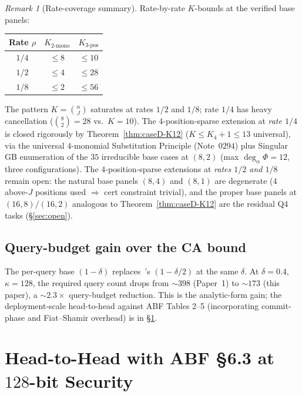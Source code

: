 \documentclass[11pt]{article}
\theoremstyle{definition}
\theoremstyle{remark}
\newtheorem{remark}[theorem]{Remark}
\begin{document}
\begin{remark}[Rate-coverage summary]
\label{rem:rate-coverage}
Rate-by-rate $K$-bounds at the verified base panels:
\begin{center}
\small
\begin{tabular}{ccc}
\toprule
Rate $\rho$ & $K_{2\text{-mono}}$ & $K_{3\text{-pos}}$ \\
\midrule
$1/4$ & $\leq 8$ & $\leq 10$ \\
$1/2$ & $\leq 4$ & $\leq 28$ \\
$1/8$ & $\leq 2$ & $\leq 56$ \\
\bottomrule
\end{tabular}
\end{center}
The pattern $K = \binom{n}{J}$ saturates at rates $1/2$ and $1/8$;
rate $1/4$ has heavy cancellation ($\binom{8}{2} = 28$ vs.\ $K = 10$).
The $4$-position-sparse extension at \emph{rate $1/4$} is closed
rigorously by Theorem~\ref{thm:caseD-K12} ($K \leq K_4 + 1 \leq 13$
universal), via the universal $4$-monomial Substitution Principle
(Note~$0294$) plus Singular GB enumeration of the $35$ irreducible
base cases at $(8, 2)$ (max $\deg_\alpha \Phi = 12$, three configurations).
The $4$-position-sparse extensions at \emph{rates $1/2$ and $1/8$}
remain open: the natural base panels $(8, 4)$ and $(8, 1)$ are
degenerate ($4$ above-$J$ positions used $\Rightarrow$ cert constraint
trivial), and the proper base panels at $(16, 8) / (16, 2)$ analogous
to Theorem~\ref{thm:caseD-K12} are the residual Q4 tasks
(\S\ref{sec:open}).
\end{remark}

\subsection{Query-budget gain over the CA bound}

The per-query base $(1-\delta)$ replaces~\cite{Paper1}'s
$(1-\delta/2)$ at the same $\delta$. At $\delta = 0.4$,
$\kappa = 128$, the required query count drops from ${\sim}398$
(Paper~1) to ${\sim}173$ (this paper), a ${\sim}2.3{\times}$
query-budget reduction. This is the analytic-form gain; the
deployment-scale head-to-head against
ABF Tables 2--5 (incorporating commit-phase and Fiat--Shamir
overhead) is in \S\ref{sec:abf-comparison}.

\section{Head-to-Head with ABF \S 6.3 at $128$-bit Security}
\label{sec:abf-comparison}
\end{document}
